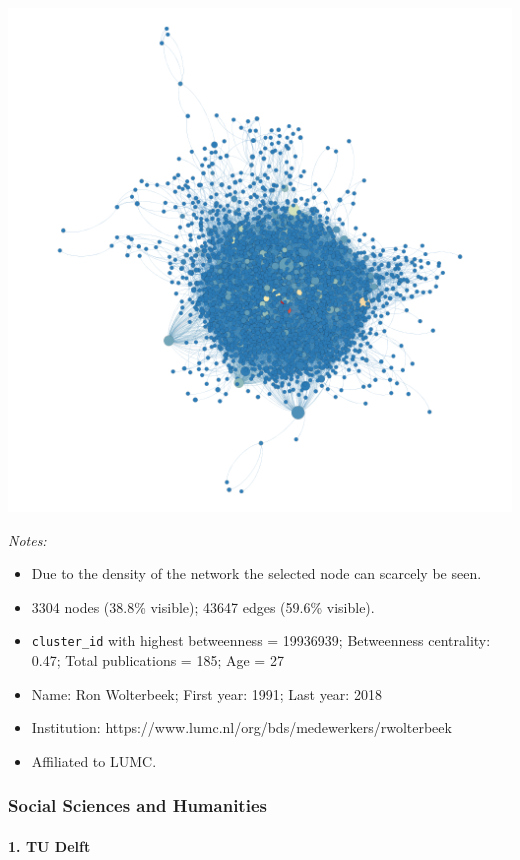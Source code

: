 \documentclass[]{elsarticle} %
\makeatletter
\providecommand{\tightlist}{%
  \setlength{\itemsep}{0pt}\setlength{\parskip}{0pt}}
\def\maxwidth{\ifdim\Gin@nat@width>\linewidth\linewidth
\else\Gin@nat@width\fi}
\let\Oldincludegraphics\includegraphics
\renewcommand{\includegraphics}[1]{\Oldincludegraphics[width=\maxwidth]{#1}}
\makeatother
\begin{document}
\includegraphics{figs/lu_bio_betweenness.png}

\emph{Notes:}

\begin{itemize}
\tightlist
\item
  Due to the density of the network the selected node can scarcely be
  seen.
\item
  3304 nodes (38.8\% visible); 43647 edges (59.6\% visible).
\item
  \texttt{cluster\_id} with highest betweenness = 19936939; Betweenness
  centrality: 0.47; Total publications = 185; Age = 27
\item
  Name: Ron Wolterbeek; First year: 1991; Last year: 2018
\item
  Institution: https://www.lumc.nl/org/bds/medewerkers/rwolterbeek
\item
  Affiliated to LUMC.
\end{itemize}

\hypertarget{social-sciences-and-humanities}{%
\subsubsection{Social Sciences and
Humanities}\label{social-sciences-and-humanities}}

\hypertarget{tu-delft-2}{%
\paragraph{1. TU Delft}\label{tu-delft-2}}
\end{document}
